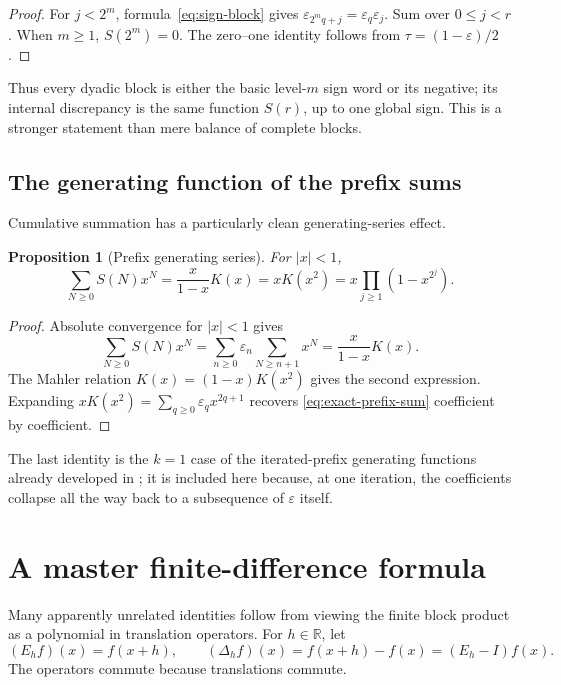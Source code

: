 \documentclass[11pt,oneside]{article}
\newtheorem{proposition}[theorem]{Proposition}
\theoremstyle{definition}
\theoremstyle{remark}
\newcommand{\R}{\mathbb R}
\begin{document}
\begin{proof}
For $j<2^m$, formula~\eqref{eq:sign-block} gives
$\varepsilon_{2^mq+j}=\varepsilon_q\varepsilon_j$.  Sum over
$0\le j<r$.  When $m\ge1$, $S(2^m)=0$.  The zero--one identity follows from
$\tau=(1-\varepsilon)/2$.
\end{proof}

Thus every dyadic block is either the basic level-$m$ sign word or its negative;
its internal discrepancy is the same function $S(r)$, up to one global sign.
This is a stronger statement than mere balance of complete blocks.

\subsection{The generating function of the prefix sums}

Cumulative summation has a particularly clean generating-series effect.

\begin{proposition}[Prefix generating series]
\label{prop:prefix-generating-series}
For $|x|<1$,
\begin{equation}
  \boxed{\displaystyle
  \sum_{N\ge0}S(N)x^N
   =\frac{x}{1-x}K(x)
   =xK(x^2)
   =x\prod_{j\ge1}(1-x^{2^j}).}                            \label{eq:prefix-generating-series}
\end{equation}
\end{proposition}

\begin{proof}
Absolute convergence for $|x|<1$ gives
\[
 \sum_{N\ge0}S(N)x^N
 =\sum_{n\ge0}\varepsilon_n\sum_{N\ge n+1}x^N
 =\frac{x}{1-x}K(x).
\]
The Mahler relation $K(x)=(1-x)K(x^2)$ gives the second expression.  Expanding
$xK(x^2)=\sum_{q\ge0}\varepsilon_qx^{2q+1}$ recovers
\eqref{eq:exact-prefix-sum} coefficient by coefficient.
\end{proof}

The last identity is the $k=1$ case of the iterated-prefix generating functions
already developed in ; it is included here
because, at one iteration, the coefficients collapse all the way back to a
subsequence of $\varepsilon$ itself.


\section{A master finite-difference formula}
\label{sec:finite-differences}

Many apparently unrelated identities follow from viewing the finite block
product as a polynomial in translation operators.  For $h\in\R$, let
\begin{equation}
  (E_hf)(x)=f(x+h),
  \qquad
  (\Delta_hf)(x)=f(x+h)-f(x)=(E_h-I)f(x).                  \label{eq:shift-difference}
\end{equation}
The operators commute because translations commute.
\end{document}
